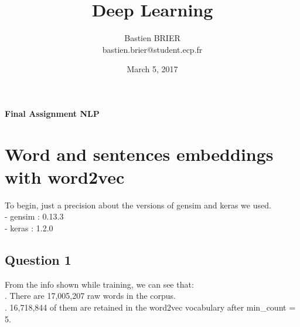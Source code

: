 \documentclass[11pt, oneside]{article}   	%
\title{Deep Learning}
\author{Bastien BRIER\\ bastien.brier@student.ecp.fr}
\date{March 5, 2017}				%
\begin{document}
\maketitle
\vspace{-10pt}
\begin{center}
{\LARGE \bf Final Assignment NLP}\\
\vspace{10pt}
\end{center}

\section{Word and sentences embeddings with word2vec}
\vspace{4pt}

To begin, just a precision about the versions of gensim and keras we used.\\
\indent - gensim : 0.13.3\\
\indent - keras : 1.2.0

\subsection{Question 1}

From the info shown while training, we can see that:\\
. There are 17,005,207 raw words in the corpus.\\
. 16,718,844 of them are retained in the word2vec vocabulary after min\_count = 5.
\end{document}
